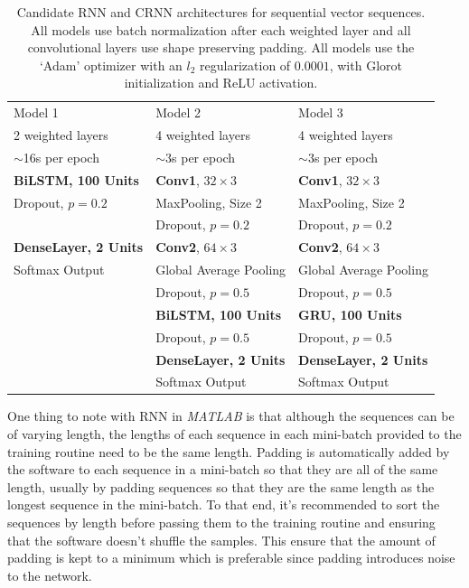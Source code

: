 \begin{table}[h!t]
\begin{center}
\begin{tabular}{l l l}
\toprule
Model 1 & Model 2 & Model 3 \\ [0.5ex]
2 weighted layers & 4 weighted layers & 4 weighted layers \\[0.5ex]
$\sim$16s per epoch & $\sim$3s per epoch & $\sim$3s per epoch \\[0.5ex]
\midrule
\textbf{BiLSTM, 100 Units} & \textbf{Conv1}, $32 \times 3$ & \textbf{Conv1}, $32 \times 3$ \\
Dropout, $p=0.2$ & MaxPooling, Size 2 & MaxPooling, Size 2 \\
& Dropout, $p=0.2$ & Dropout, $p=0.2$ \\[1ex]
\textbf{DenseLayer, 2 Units} & \textbf{Conv2}, $64 \times 3$ & \textbf{Conv2}, $64 \times 3$ \\
Softmax Output & Global Average Pooling & Global Average Pooling \\
& Dropout, $p=0.5$ & Dropout, $p=0.5$ \\[1ex]
& \textbf{BiLSTM, 100 Units} & \textbf{GRU, 100 Units} \\
& Dropout, $p=0.5$  & Dropout, $p=0.5$  \\[1ex]
& \textbf{DenseLayer, 2 Units} & \textbf{DenseLayer, 2 Units} \\
& Softmax Output & Softmax Output \\
\bottomrule
\end{tabular}
\caption{Candidate RNN and CRNN architectures for sequential vector sequences.
  All models use batch normalization after each weighted layer and all
convolutional layers use shape preserving padding. All models use the `Adam'
optimizer with an $l_2$ regularization of $0.0001$, with Glorot initialization
and ReLU activation.}\label{table:rnn_seq_vector}
\end{center}
\end{table}

One thing to note with RNN in \textit{MATLAB} is that although the sequences can
be of varying length, the lengths of each sequence in each mini-batch provided
to the training routine need to be the same length. Padding is automatically
added by the software to each sequence in a mini-batch so that they are all of
the same length, usually by padding sequences so that they are the same length
as the longest sequence in the mini-batch. To that end, it's recommended to sort
the sequences by length before passing them to the training routine and ensuring
that the software doesn't shuffle the samples. This ensure that the amount of
padding is kept to a minimum which is preferable since padding introduces noise
to the network.

